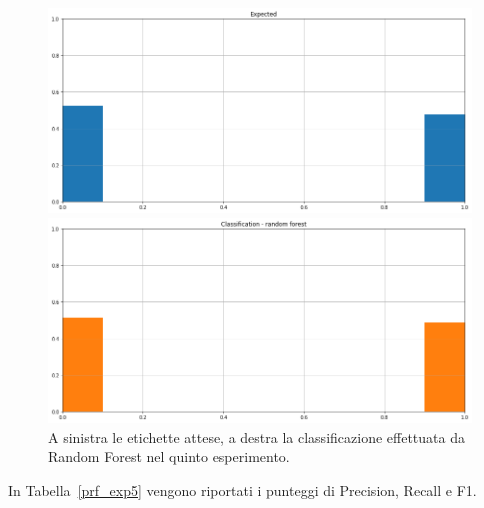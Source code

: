 \documentclass[12pt]{report}
\theoremstyle{definition}
\begin{document}
\begin{figure}
\centering
    \begin{minipage}{0.48\textwidth}
        \includegraphics[width=\linewidth]{images/experiment_beta5_sovrapposti/expected_classification.png}
    \end{minipage}
    \begin{minipage}{0.48\textwidth}
        \includegraphics[width=\linewidth]{images/experiment_beta5_sovrapposti/prediction_classification_rf.png}
    \end{minipage}
    \caption{A sinistra le etichette attese, a destra la classificazione effettuata da Random Forest nel quinto esperimento.}
    \label{rf_class_exp5}
\end{figure} 
In Tabella~\ref{prf_exp5} vengono riportati i punteggi di Precision, Recall e F1.
\end{document}
